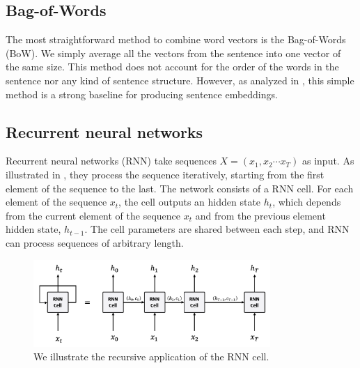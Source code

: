 


\subsection{Bag-of-Words}

The most straightforward method to combine word vectors is the Bag-of-Words (BoW). We simply average all the vectors from the sentence into one vector of the same size. This method does not account for the order of the words in the sentence nor any kind of sentence structure. However, as analyzed in \textcite{arora_17}, this simple method is a strong baseline for producing sentence embeddings.

\subsection{Recurrent neural networks}

Recurrent neural networks (RNN) \parencite{hochreiter_97, cho_14} take sequences $X = (x_1, x_2 \cdots x_T)$ as input. As illustrated in , they process the sequence iteratively, starting from the first element of the sequence to the last. The network consists of a RNN cell. For each element of the sequence $x_t$, the cell outputs an hidden state $h_t$, which depends from the current element of the sequence $x_t$ and from the previous element hidden state, $h_{t-1}$. The cell parameters are shared between each step, and RNN can process sequences of arbitrary length.

\begin{figure}[!ht]
	\includegraphics[width=9cm]{images/rnn_cell_unfold.png}
	\caption[RNN cell unfold]{We illustrate the recursive application of the RNN cell.}
\end{figure}

